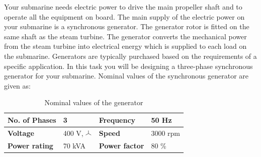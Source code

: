 \documentclass{article}
\newcommand{\wye}{\mathbin{\tikz[x=1ex,y=1ex]{\draw[line width=.1ex] (0,0)--(30:1)--++(-30:1) (30:1)--++(0,1);}}}
\begin{document}
Your submarine needs electric power to drive the main propeller shaft and to operate all the equipment on board. The main supply of the electric power on your submarine is a synchronous generator. The generator rotor is fitted on the same shaft as the steam turbine. The generator converts the mechanical power from the steam turbine into electrical energy which is supplied to each load on the submarine. Generators are typically purchased based on the requirements of a specific application. In this task you will be designing a three-phase synchronous generator for your submarine. Nominal values of the synchronous generator are given as: 
\begin{table}[h!]
    \caption{Nominal values of the generator}
    \label{tab:nominalValues}
    \begin{tabularx}{\textwidth}{|Y|Y|Y|Y|} \hline
    \textbf{No. of Phases} & 3 & \textbf{Frequency} & 50 Hz \\ \hline \textbf{Voltage} & 400 V, {\Large $\wye$} & \textbf{Speed} & 3000 rpm \\ \hline
    \textbf{Power rating} & 70 kVA & \textbf{Power factor} & 80 \% \\ \hline
    \end{tabularx}
\end{table}
\end{document}
